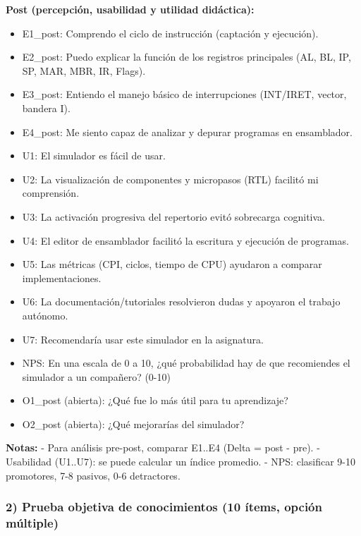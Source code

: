 \documentclass[12pt,oneside]{templates/unerthesis}
\providecommand{\tightlist}{%
  \setlength{\itemsep}{0pt}\setlength{\parskip}{0pt}}
\begin{document}
\textbf{Post (percepción, usabilidad y utilidad didáctica):}

\begin{itemize}
\tightlist
\item
  E1\_post: Comprendo el ciclo de instrucción (captación y ejecución).
\item
  E2\_post: Puedo explicar la función de los registros principales (AL, BL, IP, SP, MAR, MBR, IR, Flags).
\item
  E3\_post: Entiendo el manejo básico de interrupciones (INT/IRET, vector, bandera I).
\item
  E4\_post: Me siento capaz de analizar y depurar programas en ensamblador.
\item
  U1: El simulador es fácil de usar.
\item
  U2: La visualización de componentes y micropasos (RTL) facilitó mi comprensión.
\item
  U3: La activación progresiva del repertorio evitó sobrecarga cognitiva.
\item
  U4: El editor de ensamblador facilitó la escritura y ejecución de programas.
\item
  U5: Las métricas (CPI, ciclos, tiempo de CPU) ayudaron a comparar implementaciones.
\item
  U6: La documentación/tutoriales resolvieron dudas y apoyaron el trabajo autónomo.
\item
  U7: Recomendaría usar este simulador en la asignatura.
\item
  NPS: En una escala de 0 a 10, ¿qué probabilidad hay de que recomiendes el simulador a un compañero? (0-10)
\item
  O1\_post (abierta): ¿Qué fue lo más útil para tu aprendizaje?
\item
  O2\_post (abierta): ¿Qué mejorarías del simulador?
\end{itemize}

\textbf{Notas:}
- Para análisis pre-post, comparar E1..E4 (Delta = post - pre).
- Usabilidad (U1..U7): se puede calcular un índice promedio.
- NPS: clasificar 9-10 promotores, 7-8 pasivos, 0-6 detractores.

\hypertarget{prueba-objetiva-de-conocimientos-10-uxedtems-opciuxf3n-muxfaltiple}{%
\subsubsection{2) Prueba objetiva de conocimientos (10 ítems, opción múltiple)}\label{prueba-objetiva-de-conocimientos-10-uxedtems-opciuxf3n-muxfaltiple}}
\end{document}
